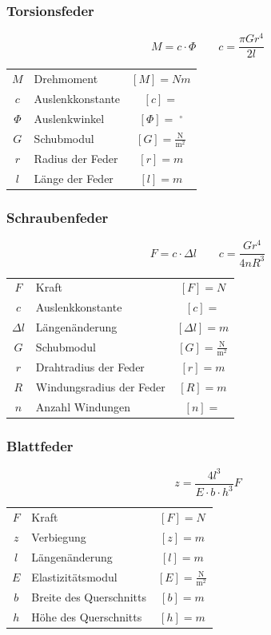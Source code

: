 		\subsubsection{Torsionsfeder}
		
			$$ \boxed{ M = c \cdot \varPhi \quad \quad c = \frac{\pi G r^4}{2l} }$$ 

			\begin{tabular}{c l c}
				$M$ & Drehmoment & $[M] = Nm$ \\
				$c$ & Auslenkkonstante & $[c] = $ \\
				$\varPhi$ & Auslenkwinkel & $[\varPhi] = \; ^\circ $ \\
				$G$ & Schubmodul & $[G] = \mathrm{\frac{N}{m^2}}$ \\
				$r$ & Radius der Feder & $[r] = m$ \\
				$l$ & Länge der Feder & $[l] = m$ \\
			\end{tabular}

		\subsubsection{Schraubenfeder}
		
			$$ \boxed{ F = c \cdot \Delta l \quad \quad c = \frac{G r^4}{4nR^3} }$$ 

			\begin{tabular}{c l c}
				$F$ & Kraft & $[F] = N$ \\
				$c$ & Auslenkkonstante & $[c] = $ \\
				$\Delta l$ & Längenänderung & $[\Delta l] = m$ \\
				$G$ & Schubmodul & $[G] = \mathrm{\frac{N}{m^2}}$ \\
				$r$ & Drahtradius der Feder & $[r] = m$ \\
				$R$ & Windungsradius der Feder & $[R] = m$ \\
				$n$ & Anzahl Windungen & $[n] = $ \\
			\end{tabular}

		\subsubsection{Blattfeder}
		
			$$ \boxed{ z = \frac{4l^3}{E \cdot b \cdot h^3}F }$$ 

			\begin{tabular}{c l c}
				$F$ & Kraft & $[F] = N$ \\
				$z$ & Verbiegung & $[z] = m$ \\
				$l$ & Längenänderung & $[l] = m$ \\
				$E$ & Elastizitätsmodul & $[E] = \mathrm{\frac{N}{m^2}}$ \\
				$b$ & Breite des Querschnitts & $[b] = m$ \\
				$h$ & Höhe des Querschnitts & $[h] = m$ \\
			\end{tabular}

